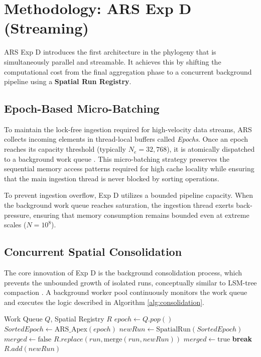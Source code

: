 \section{Methodology: ARS Exp D (Streaming)} \label{sec:streaming}
ARS Exp D introduces the first architecture in the phylogeny that is simultaneously parallel and streamable. It achieves this by shifting the computational cost from the final aggregation phase to a concurrent background pipeline using a \textbf{Spatial Run Registry}.

\subsection{Epoch-Based Micro-Batching}
To maintain the lock-free ingestion required for high-velocity data streams, ARS collects incoming elements in thread-local buffers called \textit{Epochs}. Once an epoch reaches its capacity threshold (typically $N_e = 32,768$), it is atomically dispatched to a background work queue \cite{zahariaDiscretizedStreamsFaulttolerant2013}. This micro-batching strategy preserves the sequential memory access patterns required for high cache locality while ensuring that the main ingestion thread is never blocked by sorting operations.

To prevent ingestion overflow, Exp D utilizes a bounded pipeline capacity. When the background work queue reaches saturation, the ingestion thread exerts back-pressure, ensuring that memory consumption remains bounded even at extreme scales ($N=10^8$).

\subsection{Concurrent Spatial Consolidation}
The core innovation of Exp D is the background consolidation process, which prevents the unbounded growth of isolated runs, conceptually similar to LSM-tree compaction \cite{oneilLogstructuredMergetreeLSMtree1996}. A background worker pool continuously monitors the work queue and executes the logic described in Algorithm \ref{alg:consolidation}.

\begin{algorithm}
\caption{Concurrent Spatial Consolidation}
\label{alg:consolidation}
\begin{algorithmic}[1]
\REQUIRE Work Queue $Q$, Spatial Registry $R$
\LOOP
    \STATE $epoch \leftarrow Q.pop()$
    \STATE $SortedEpoch \leftarrow \text{ARS\_Apex}(epoch)$
    \STATE $newRun \leftarrow \text{SpatialRun}(SortedEpoch)$
    \STATE $merged \leftarrow \text{false}$
            \STATE $R.replace(run, \text{merge}(run, newRun))$
            \STATE $merged \leftarrow \text{true}$
            \STATE \textbf{break}
        \ENDIF
    \ENDFOR
        \STATE $R.add(newRun)$
    \ENDIF
\ENDLOOP
\end{algorithmic}
\end{algorithm}

